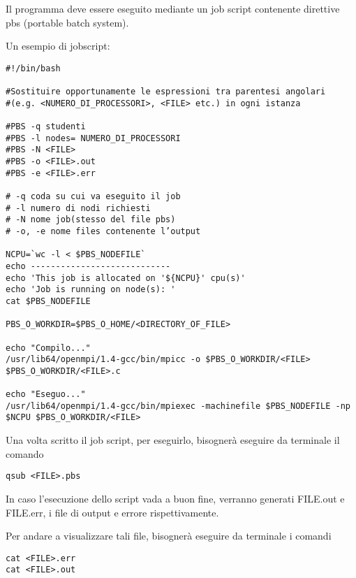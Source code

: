 Il programma deve essere eseguito mediante un job script contenente direttive pbs (portable batch system).

Un esempio di jobscript:
\begin{lstlisting}
#!/bin/bash

#Sostituire opportunamente le espressioni tra parentesi angolari 
#(e.g. <NUMERO_DI_PROCESSORI>, <FILE> etc.) in ogni istanza

#PBS -q studenti
#PBS -l nodes= NUMERO_DI_PROCESSORI
#PBS -N <FILE>
#PBS -o <FILE>.out
#PBS -e <FILE>.err

# -q coda su cui va eseguito il job
# -l numero di nodi richiesti
# -N nome job(stesso del file pbs)
# -o, -e nome files contenente l’output

NCPU=`wc -l < $PBS_NODEFILE`
echo ----------------------------
echo 'This job is allocated on '${NCPU}' cpu(s)'
echo 'Job is running on node(s): '
cat $PBS_NODEFILE

PBS_O_WORKDIR=$PBS_O_HOME/<DIRECTORY_OF_FILE>

echo "Compilo..."
/usr/lib64/openmpi/1.4-gcc/bin/mpicc -o $PBS_O_WORKDIR/<FILE> $PBS_O_WORKDIR/<FILE>.c

echo "Eseguo..."
/usr/lib64/openmpi/1.4-gcc/bin/mpiexec -machinefile $PBS_NODEFILE -np $NCPU $PBS_O_WORKDIR/<FILE>
\end{lstlisting}

Una volta scritto il job script, per eseguirlo, bisognerà eseguire da terminale il comando 
\begin{lstlisting}
qsub <FILE>.pbs
\end{lstlisting}

In caso l'esecuzione dello script vada a buon fine, verranno generati FILE.out e FILE.err, i file di output e errore rispettivamente.

Per andare a visualizzare tali file, bisognerà eseguire da terminale i comandi
\begin{lstlisting}
cat <FILE>.err
cat <FILE>.out
\end{lstlisting}